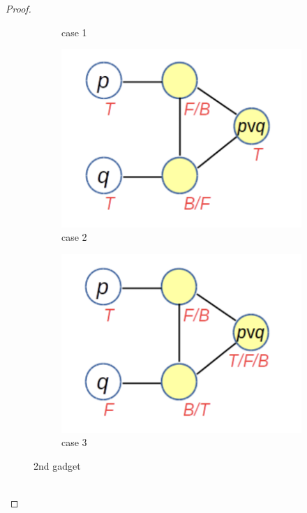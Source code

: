 \documentclass[12pt]{article}
\begin{document}
\begin{proof}
\begin{figure}[ht]
\begin{subfigure}[b]{0.3\textwidth}
        \caption{case 1}
        \label{fig:img1}
    \end{subfigure}
    \hfill
    \begin{subfigure}[b]{0.3\textwidth}
        \includegraphics[width=\textwidth]{img/3-coloring-2g2.png}
        \caption{case 2}
        \label{fig:img2}
    \end{subfigure}
    \hfill
    \begin{subfigure}[b]{0.3\textwidth}
        \includegraphics[width=\textwidth]{img/3-coloring-2g3.png}
        \caption{case 3}
        \label{fig:img3}
    \end{subfigure}
    \caption{2nd gadget}
    \label{fig:images}
\end{figure}
\\

\end{proof}
\end{document}

